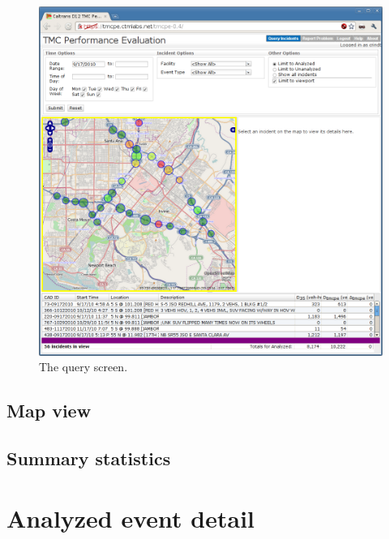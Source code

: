 \documentclass[12pt]{report}
\renewcommand{\fixme}[3][]{#1\xspace}
\newcounter{space}
\begin{document}
\begin{figure}[t]
  \begin{center}
    \includegraphics[width=\textwidth]{images/tmcpe-query-screen.png}
    \caption{The query screen.}
    \label{fig:tmcpe-1}
  \end{center}
\end{figure}


\subsection{Map view}
\label{sec:ui-summary-stats}

\fixme{crindt}{Map legend.}

\subsection{Summary statistics}
\label{sec:ui-summary-stats}

\section{Analyzed event detail}
\label{sec:ui-analyzed-event-detail}
\end{document}
